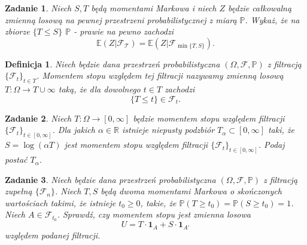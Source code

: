 \documentclass[12pt]{article}
\newtheorem{df}{Definicja}
\newtheorem{zd}{Zadanie}
\begin{document}
\begin{zd}
	Niech $S, T$ będą momentami Markowa  i niech $Z$ będzie całkowalną zmienną losową na pewnej przestrzeni probabilistycznej z miarą $\mathbb{P}$. Wykaż, że na zbiorze $\{T \leq S\}$ $\mathbb{P}$ - prawie na pewno zachodzi
	\begin{displaymath}
		\mathbb{E}(Z|\mathcal{F_T}) = \mathbb{E}(Z|\mathcal{F}_{\min\{T,S\}}).
	\end{displaymath}
\end{zd}
\begin{df}
	Niech będzie dana przestrzeń probabilistyczna  $(\Omega, \mathcal{F}, \mathbb{P})$ z filtracją $\{\mathcal{F}_t\}_{t\in T}$. Momentem stopu względem tej filtracji nazywamy zmienną losową $T\colon \Omega \to T \cup {\infty}$ taką, że dla dowolnego $t\in T$ zachodzi 
	\begin{displaymath}
		\{T \leq t\} \in \mathcal{F}_t.
	\end{displaymath}
\end{df}
\begin{zd}
	Niech $T\colon \Omega \to [0,\infty]$ będzie momentem stopu względem filtracji $\{\mathcal{F}_t\}_{t\in [0,\infty]}$. Dla jakich $\alpha \in \mathbb{R}$ istnieje niepusty podzbiór $T_{\alpha} \subset [0,\infty]$ taki, że $S = \log(\alpha T)$ jest momentem stopu względem filtracji $\{\mathcal{F}_t\}_{t\in [0,\infty]}$. Podaj postać $T_{\alpha}$.
\end{zd}


\begin{zd}
	Niech będzie dana przestrzeń probabilistyczna $(\Omega, \mathcal{F}, \mathbb{P})$ z filtracją zupełną $\{\mathcal{F}_n\}$. Niech $T, S$ będą dwoma momentami Markowa o skończonych wartościach takimi, że istnieje $t_0 \geq 0$, takie, że $\mathbb{P}(T \geq t_0) = \mathbb{P}(S \geq t_0) = 1$. Niech $A\in \mathcal{F}_{t_0}$. Sprawdź, czy momentem stopu jest zmienna losowa 
	\begin{displaymath}
	U = T\cdot\pmb{1}_A + S\cdot \pmb{1}_{A'}
	\end{displaymath}
	względem podanej filtracji.
\end{zd}
\end{document}
